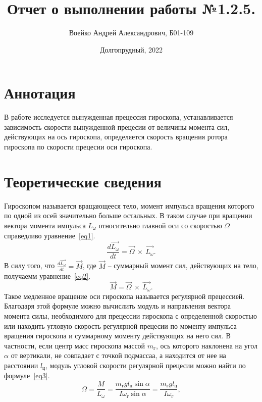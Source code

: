 \documentclass[a4paper,11pt]{article}
\title{Отчет о выполнении работы №1.2.5.}
\author{Воейко Андрей Александрович, Б01-109}
\date{Долгопрудный, 2022}
\begin{document}
\maketitle
\newpage
\section{Аннотация}
В работе исследуется вынужденная прецессия гироскопа, устанавливается зависимость скорости вынужденной прецесии от величины момента сил, действующих на ось гироскопа, определяется скорость вращения ротора гироскопа по скорости прецесии оси гироскопа.
\section{Теоретические сведения}
Гироскопом называется вращающееся тело, момент импульса вращения которого по одной из осей значительно больше остальных. В таком случае при вращении вектора момента импульса $L_{\omega}$ относительно главной оси со скоростью $\Omega$ справедливо уравнение~\ref{eq1}.\newline
\begin{equation}    \label{eq1}
  \frac{d \overrightarrow{L_{\omega}}}{dt} = \overrightarrow{\Omega}\ \times\ \overrightarrow{L_{\omega}}.
\end{equation}
В силу того, что $\frac{d \overrightarrow{L_{\omega}}}{dt} = \overrightarrow{M}$, где $\overrightarrow{M}$ -- суммарный момент сил, действующих на тело, получаемм уравнение~\ref{eq2}.\newline
\begin{equation}    \label{eq2}
  \overrightarrow{M} = \overrightarrow{\Omega}\ \times\ \overrightarrow{L_{\omega}}.
\end{equation}
Такое медленное вращение оси гироскопа называется регулярной прецессией.\newline
Благодаря этой формуле можно вычислить модуль и направления вектора момента силы, необходимого для прецессии гироскопа с определенной скоростью или находить угловую скорость регулярной прецесии по моменту импульса вращения гироскопа и суммарному моменту действующих на него сил.\newline
В частности, если центр масс гироскопа массой $m_{г}$, ось которого наклонена на угол $\alpha$ от вертикали, не совпадает с точкой подмассаа, а находится от нее на расстоянии $l_{ц}$, модуль угловой скорости регулярной прецесии можно найти по формуле~\ref{eq3}.\newline
\begin{equation}    \label{eq3}
  \Omega = \frac{M}{L_{\omega}} = \frac{m_{г}gl_{ц} \sin\alpha}{I \omega_{г} \sin\alpha} = \frac{m_{г}gl_{ц}}{I \omega_{г}},
\end{equation}
\end{document}
